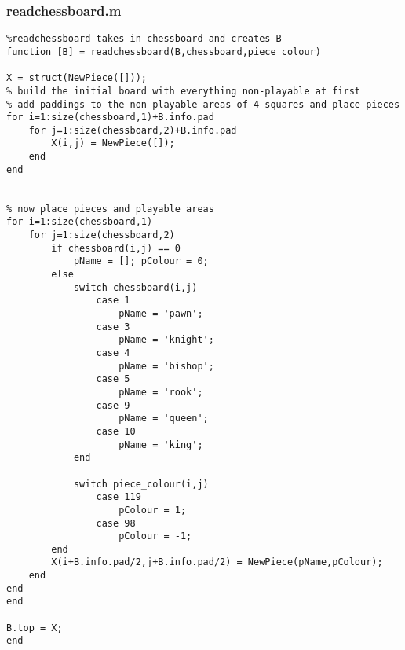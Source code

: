 \documentclass{article}
\begin{document}
\subsubsection{readchessboard.m}
\begin{lstlisting}
%readchessboard takes in chessboard and creates B
function [B] = readchessboard(B,chessboard,piece_colour)

X = struct(NewPiece([]));
% build the initial board with everything non-playable at first
% add paddings to the non-playable areas of 4 squares and place pieces
for i=1:size(chessboard,1)+B.info.pad
    for j=1:size(chessboard,2)+B.info.pad
        X(i,j) = NewPiece([]);
    end
end


% now place pieces and playable areas
for i=1:size(chessboard,1)
    for j=1:size(chessboard,2)
        if chessboard(i,j) == 0
            pName = []; pColour = 0;
        else
            switch chessboard(i,j)
                case 1
                    pName = 'pawn';
                case 3
                    pName = 'knight';
                case 4
                    pName = 'bishop';
                case 5
                    pName = 'rook';
                case 9
                    pName = 'queen';
                case 10
                    pName = 'king';
            end
            
            switch piece_colour(i,j)
                case 119
                    pColour = 1;
                case 98
                    pColour = -1;
        end
        X(i+B.info.pad/2,j+B.info.pad/2) = NewPiece(pName,pColour);
    end
end
end

B.top = X;
end
\end{lstlisting}
\end{document}
